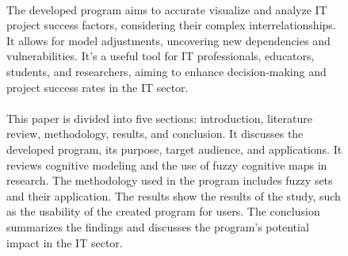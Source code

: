 \documentclass{article}
\begin{document}
\begin{figure}[!t]
\begin{minipage}{0.49\textwidth}
            ~\\
            The developed program aims to accurate visualize and analyze IT project success factors, considering their complex interrelationships. It allows for model adjustments, uncovering new dependencies and vulnerabilities. It's a useful tool for IT professionals, educators, students, and researchers, aiming to enhance decision-making and project success rates in the IT sector.\\
            ~\\
            This paper is divided into five sections: introduction, literature review, methodology, results, and conclusion. It discusses the developed program, its purpose, target audience, and applications. It reviews cognitive modeling and the use of fuzzy cognitive maps in research. The methodology used in the program includes fuzzy sets and their application. The results show the results of the study, such as the usability of the created program for users. The conclusion summarizes the findings and discusses the program's potential impact in the IT sector.\\
            ~\\
            ~\\
            ~\\
            ~\\
            ~\\
            ~\\
            ~\\
            ~\\
            ~\\
            ~\\
            ~\\
            ~\\
            ~\\
            ~\\
            ~\\
            ~\\
            ~\\
            ~\\
            ~\\
            ~\\
            ~\\
            ~\\
            ~\\
            ~\\
            ~\\
            ~\\

\end{minipage}
\end{figure}
\end{document}
